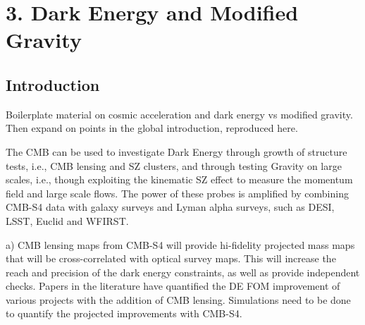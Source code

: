 \documentclass[11pt]{article}
\begin{document}
%


\chapter{3. Dark Energy and Modified Gravity}


\section{Introduction}

Boilerplate material on cosmic acceleration and dark energy vs modified gravity.  Then expand on points in the global introduction, reproduced here.

 The CMB can be used to investigate Dark Energy through growth of structure tests, i.e., CMB lensing and SZ clusters, and through testing Gravity on large scales, i.e., though exploiting the kinematic SZ effect to measure the momentum field and large scale flows. The power of these probes is amplified by combining CMB-S4 data with galaxy surveys and Lyman alpha surveys, such as DESI, LSST, Euclid and WFIRST.

 a) CMB lensing maps from CMB-S4 will provide hi-fidelity projected mass maps that will be cross-correlated with optical survey maps. This will increase the reach and precision of the dark energy constraints, as well as provide independent checks. Papers in the literature have quantified the DE FOM improvement of various projects with the addition of CMB lensing. Simulations need to be done to quantify the projected improvements with CMB-S4.
\end{document}
